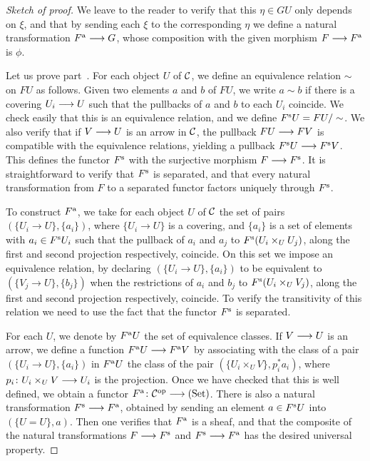 \begin{2   CONTRAVARIANT FUNCTORS}
\begin{2.3 Sheaves in Grothendieck topologies}
\begin{proof}[Sketch of proof]
We leave to the reader to verify that this $\eta \in GU$ only depends on $\xi$, and that by sending each $\xi$ to the corresponding $\eta$ we define a natural transformation $F\ass \arr G$, whose composition with the given morphism $F \arr F\ass$ is $\phi$. 



Let us prove part~. For each object $U$ of $\mathcal{C}$, we define an equivalence relation $\sim$ on $F U$ as follows. Given two elements $a$ and $b$ of $F U$, we write $a \sim b$ if there is a covering $U_i \arr U$ such that the pullbacks of $a$ and $b$ to each $ U_i$ coincide. We check easily that this is an equivalence relation, and we define $F^\mathrm{s} U  = F U/\sim$. We also verify that if $V \arr U$ is an arrow in $\mathcal{C}$, the pullback $F U \arr F V$ is compatible with the equivalence relations, yielding a pullback $F\sep U \arr F\sep V$. This defines the functor $F^\mathrm{s}$ with the surjective morphism $F \arr F\sep$. It is straightforward to verify that $F^\mathrm{s}$ is separated, and that every natural transformation from $F$ to a separated functor factors uniquely through $F^\mathrm{s}$.

To construct $F^\mathrm{a}$, we  take for each object $U$ of $\mathcal{C}$ the set of pairs $(\{U_i \to U\}, \{a_i\})$, where $\{U_i \to U\}$ is a covering, and $\{a_i\}$ is a set of elements with $a_i \in F^\mathrm{s} U_i$ such that the pullback of $a_i$ and $a_j$ to $F^\mathrm{s}(U_i \times_U U_j)$, along the first and second projection respectively, coincide. On this set we impose an equivalence relation, by declaring $(\{U_i \to U\}, \{a_i\})$ to be equivalent to $(\{V_j \to U\}, \{b_j\})$ when the restrictions of $a_i$ and $b_j$ to $F^\mathrm{s}(U_i \times_U V_j)$, along the first and second projection respectively, coincide. To verify the transitivity of this relation we need to use the fact that the functor $F^\mathrm{s}$ is separated.

For each $U$, we denote by $F^\mathrm{a} U$ the set of equivalence classes. If $V \arr U$ is an arrow, we define a function $F\ass U \arr F\ass V$ by associating with the class of a pair $(\{U_i \to U\}, \{a_i\})$ in $F^\mathrm{a} U$ the class of the pair $(\{U_i \times_U V\}, p_i^* a_i)$, where $p_i \colon U_i\times_U V \arr U_i$ is the projection. Once we have checked that this is well defined, we obtain a functor $F\ass \colon \cC\op \arr \catset$. There is also a natural transformation $F\sep \arr F\ass$, obtained by sending an element $a \in F^\mathrm{s} U$ into $(\{U = U\}, a)$. Then one verifies that $F^\mathrm{a}$ is a sheaf, and that the composite of the natural transformations $F \arr F\sep$ and $F\sep \arr F\ass$ has the desired universal property.


\end{proof}
\end{2.3 Sheaves in Grothendieck topologies}
\end{2   CONTRAVARIANT FUNCTORS}
